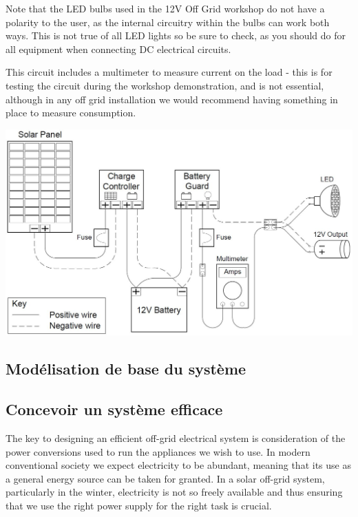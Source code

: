 \documentclass{article}
\theoremstyle{definition}
\theoremstyle{definition}
\theoremstyle{remark}
\begin{document}
  Note that the LED bulbs used in the 12V Off Grid workshop do not have a polarity to the user, as the internal circuitry within the bulbs can work both ways. This is not true of all LED lights so be sure to check, as you should do for all equipment when connecting DC electrical circuits.

  This circuit includes a multimeter to measure current on the load - this is for testing the circuit during the workshop demonstration, and is not essential, although in any off grid installation we would recommend having something in place to measure consumption.

  \begin{center}
    \includegraphics[width=0.75\paperwidth]{Images/image_11_2_(12v_system).png}
  \end{center}

  {\color{blue}\subsection{Modélisation de base du système}} %
  \label{sec:modelisation_de_base_du_systeme}
  

  {\color{blue}\subsection{Concevoir un système efficace}} %
  \label{sub:concevoir_un_systeme_efficace}

    The key to designing an efficient off-grid electrical system is consideration of the power conversions used to run the appliances we wish to use. In modern conventional society we expect electricity to be abundant, meaning that its use as a general energy source can be taken for granted. In a solar off-grid system, particularly in the winter, electricity is not so freely available and thus ensuring that we use the right power supply for the right task is crucial. 
\end{document}
